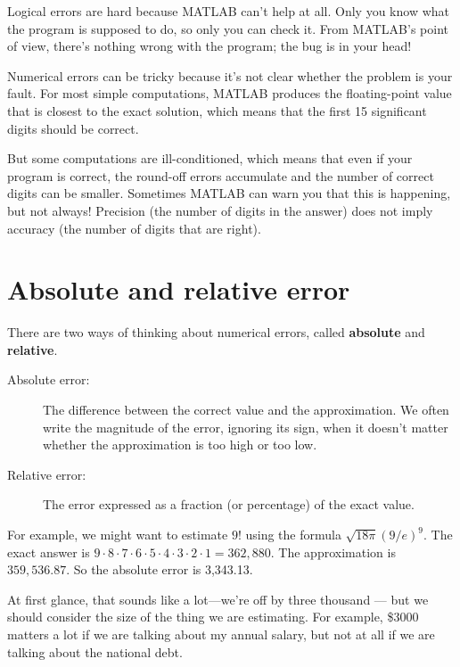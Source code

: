 Logical errors are hard because MATLAB can't help at all.  Only you
know what the program is supposed to do, so only you can check it.
From MATLAB's point of view, there's nothing wrong with the program;
the bug is in your head!


Numerical errors can be tricky because it's not clear whether the
problem is your fault.  For most simple computations, MATLAB produces
the floating-point value that is closest to the exact solution, which
means that the first 15 significant digits should be correct.  

But some computations are ill-conditioned, which means that even if your program is correct, the round-off errors accumulate and the number of correct digits can be smaller.  Sometimes MATLAB can warn you that
this is happening, but not always!  Precision (the number of digits
in the answer) does not imply accuracy (the number of digits that
are right).


\section{Absolute and relative error}

There are two ways of thinking about numerical errors, called {\bf
absolute} and {\bf relative}.


\begin{description}

\item[Absolute error:] The difference between the correct value and
the approximation.  We often write the magnitude of the error,
ignoring its sign, when it doesn't matter whether the approximation
is too high or too low.

\item[Relative error:] The error expressed as a fraction (or percentage)
of the exact value.
\end{description}

For example, we might want to estimate $9!$ using the formula $\sqrt
{18 \pi} ( 9 / e)^9$.  The exact answer is $9 \cdot 8 \cdot 7 \cdot 6
\cdot 5 \cdot 4 \cdot 3 \cdot 2 \cdot 1 = 362,880$.  The approximation
is $359,536.87$.  So the absolute error is 3,343.13.

At first glance, that sounds like a lot---we're off by three
thousand --- but we should consider the size of the
thing we are estimating.  For example, \$3000 matters a lot
if we are talking about my annual salary, but not at all if we
are talking about the national debt.

